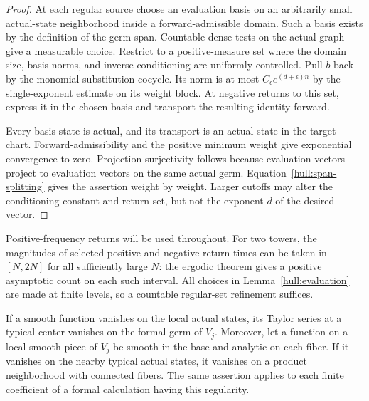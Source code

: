 \begin{proof}
At each regular source choose an evaluation basis on an arbitrarily
small actual-state neighborhood inside a forward-admissible domain.
Such a basis exists by the definition of the germ span. Countable dense
tests on the actual graph give a measurable choice. Restrict to a
positive-measure set where the domain size, basis norms, and inverse
conditioning are uniformly controlled. Pull $b$ back by the monomial
substitution cocycle. Its norm is at most
$C_\epsilon e^{(d+\epsilon)n}$ by the single-exponent estimate on its
weight block. At negative returns to this set, express it in the chosen
basis and transport the resulting identity forward.

Every basis state is actual, and its transport is an actual state in
the target chart. Forward-admissibility and the positive minimum weight
give exponential convergence to zero. Projection surjectivity follows
because evaluation vectors project to evaluation vectors on the same
actual germ. Equation~\eqref{hull:span-splitting} gives the assertion
weight by weight. Larger cutoffs may alter the conditioning constant
and return set, but not the exponent $d$ of the desired vector.
\end{proof}

Positive-frequency returns will be used throughout. For two towers,
the magnitudes of selected positive and negative return times can be
taken in $[N,2N]$ for all sufficiently large $N$: the ergodic theorem
gives a positive asymptotic count on each such interval. All choices in
Lemma~\ref{hull:evaluation} are made at finite levels, so a countable
regular-set refinement suffices.

\begin{lemma}
\label{hull:identities}
If a smooth function vanishes on the local actual states, its Taylor
series at a typical center vanishes on the formal germ of $V_j$.
Moreover, let a function on a local smooth piece of $V_j$ be smooth in
the base and analytic on each fiber. If it vanishes on the nearby
typical actual states, it vanishes on a product neighborhood with
connected fibers. The same assertion applies to each finite coefficient
of a formal calculation having this regularity.
\end{lemma}

